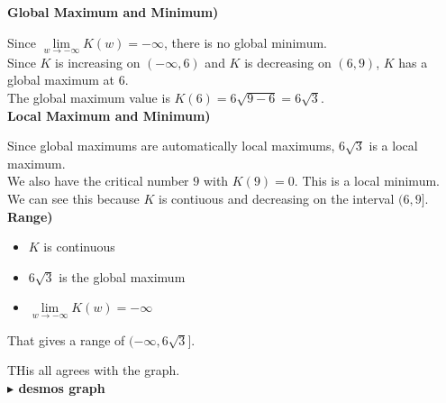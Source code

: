 \documentclass{ximera}
\begin{document}
\begin{example}
\textbf{Global Maximum and Minimum)}



Since $\lim\limits_{w \to -\infty} K(w) = -\infty$, there is no global minimum. \\


Since $K$ is increasing on $(-\infty, 6)$ and $K$ is decreasing on $(6, 9)$, $K$ has a global maximum at $6$.  \\

The global maximum value is $K(6) = 6 \sqrt{9 - 6} = 6 \sqrt{3}$. \\




\textbf{Local Maximum and Minimum)}


Since global maximums are automatically local maximums, $6 \sqrt{3}$ is a local maximum. \\


We also have the critical number $9$ with $K(9) = 0$.  This is a local minimum.  We can see this because $K$ is contiuous and decreasing on the interval $(6, 9]$. \\









\textbf{Range)}

\begin{itemize}
  \item $K$ is continuous
  \item $6 \sqrt{3}$ is the global maximum
  \item $\lim\limits_{w \to -\infty} K(w) = -\infty$
\end{itemize}

That gives a range of $(-\infty, 6 \sqrt{3}]$.




THis all agrees with the graph. \\




\textbf{\textcolor{blue!55!black}{$\blacktriangleright$ desmos graph}} 
\begin{center}
\end{center}






\end{example}
\end{document}
